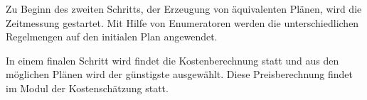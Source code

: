 Zu Beginn des zweiten Schritts, der Erzeugung von äquivalenten Plänen, wird die Zeitmessung gestartet.  Mit Hilfe von Enumeratoren werden die unterschiedlichen Regelmengen auf den initialen Plan angewendet.

In einem finalen Schritt wird findet die Kostenberechnung statt und aus den möglichen Plänen wird der günstigste ausgewählt. Diese Preisberechnung findet im Modul der Kostenschätzung statt.



